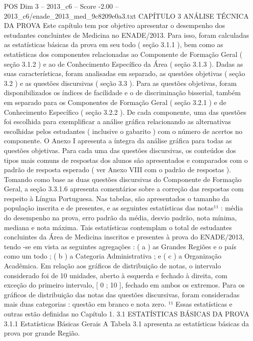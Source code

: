 \begin{textsample}{POS Dim 3 – 2013\_c6 – Score -2.00 – 2013\_c6/enade\_2013\_med\_9c8209e0a3.txt}  \label{ex:f3_pos_231}
CAPÍTULO 3 ANÁLISE TÉCNICA DA PROVA Este capítulo tem por objetivo apresentar o desempenho dos estudantes concluintes de Medicina no ENADE/2013.
Para isso, foram calculadas as estatísticas básicas da prova em seu todo ( seção 3.1.1 ), bem como as estatísticas dos componentes relacionadas ao Componente de Formação Geral ( seção 3.1.2 ) e ao de Conhecimento Específico da Área ( seção 3.1.3 ).
Dadas as suas características, foram analisadas em separado, as questões objetivas ( seção 3.2 ) e as questões discursivas ( seção 3.3 ).
Para as questões objetivas, foram disponibilizados os índices de facilidade e o de discriminação bisserial, também em separado para os Componentes de Formação Geral ( seção 3.2.1 ) e de Conhecimento Específico ( seção 3.2.2 ).
De cada componente, uma das questões foi escolhida para exemplificar a análise gráfica relacionando as alternativas escolhidas pelos estudantes ( inclusive o gabarito ) com o número de acertos no componente.
O Anexo I apresenta a íntegra da análise gráfica para todas as questões objetivas.
Para cada uma das questões discursivas, os conteúdos dos tipos mais comuns de respostas dos alunos são apresentados e comparados com o padrão de resposta esperado ( ver Anexo VIII com o padrão de respostas ).
Tomando como base as duas questões discursivas do Componente de Formação Geral, a seção 3.3.1.6 apresenta comentários sobre a correção das respostas com respeito à Língua Portuguesa.
Nas tabelas, são apresentados o tamanho da população inscrita e de presentes, e as seguintes estatísticas das notas¹¹ : média do desempenho na prova, erro padrão da média, desvio padrão, nota mínima, mediana e nota máxima.
Tais estatísticas contemplam o total de estudantes concluintes da Área de Medicina inscritos e presentes à prova do ENADE/2013, tendo -se em vista as seguintes agregações : ( a ) as Grandes Regiões e o país como um todo ; ( b ) a Categoria Administrativa ; e ( c ) a Organização Acadêmica.
Em relação aos gráficos de distribuição de notas, o intervalo considerado foi de 10 unidades, aberto à esquerda e fechado à direita, com exceção do primeiro intervalo, [ 0 ; 10 ], fechado em ambos os extremos.
Para os gráficos de distribuição das notas das questões discursivas, foram consideradas mais duas categorias : questão em branco e nota zero. ¹¹ Essas estatísticas e outras estão definidas no Capítulo 1. 3.1 ESTATÍSTICAS BÁSICAS DA PROVA 3.1.1 Estatísticas Básicas Gerais A Tabela 3.1 apresenta as estatísticas básicas da prova por grande Região.

\end{textsample}
